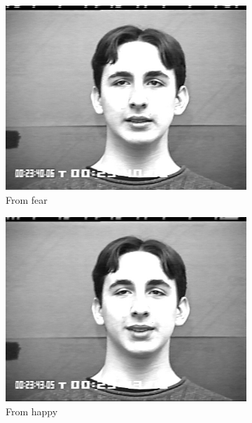 \begin{figure}
	\begin{subfigure}[b]{0.2\textwidth}
		\includegraphics[width=\textwidth]{./img/indistinguishable/fear.png}
		\caption{From fear}
		\label{fig:indistinguishable:fear}
	\end{subfigure}
	\begin{subfigure}[b]{0.2\textwidth}
		\includegraphics[width=\textwidth]{./img/indistinguishable/happy.png}
		\caption{From happy}
		\label{fig:indistinguishable:happy}
	\end{subfigure}
	\begin{subfigure}[b]{0.2\textwidth}

\end{subfigure}
\end{figure}
